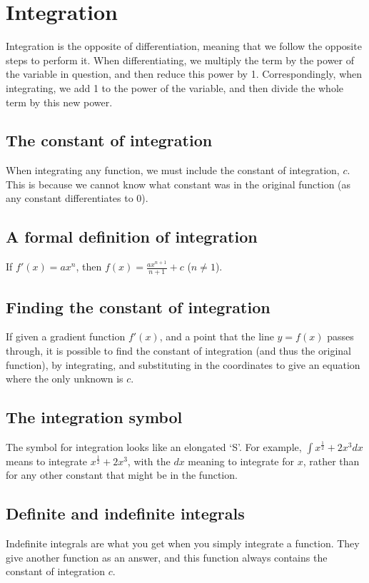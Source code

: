 \section{Integration}
Integration is the opposite of differentiation, meaning that we follow the opposite steps to perform it. When differentiating, we multiply the term by the power of the variable in question, and then reduce this power by 1. Correspondingly, when integrating, we add 1 to the power of the variable, and then divide the whole term by this new power.

\subsection{The constant of integration}
When integrating any function, we must include the constant of integration, $c$. This is because we cannot know what constant was in the original function (as any constant differentiates to 0).

\subsection{A formal definition of integration}
If $f'(x) = ax^n$, then $f(x)=\frac{ax^{n+1}}{n+1}+c$ ($n\ne 1$).

\subsection{Finding the constant of integration}
If given a gradient function $f'(x)$, and a point that the line $y=f(x)$ passes through, it is possible to find the constant of integration (and thus the original function), by integrating, and substituting in the coordinates to give an equation where the only unknown is $c$.

\subsection{The integration symbol}
The symbol for integration looks like an elongated `S'. For example, $\int x^{\frac{1}{2}}+2x^3 dx$ means to integrate $x^{\frac{1}{2}}+2x^3$, with the $dx$ meaning to integrate for $x$, rather than for any other constant that might be in the function.

\subsection{Definite and indefinite integrals}
Indefinite integrals are what you get when you simply integrate a function. They give another function as an answer, and this function always contains the constant of integration $c$.

